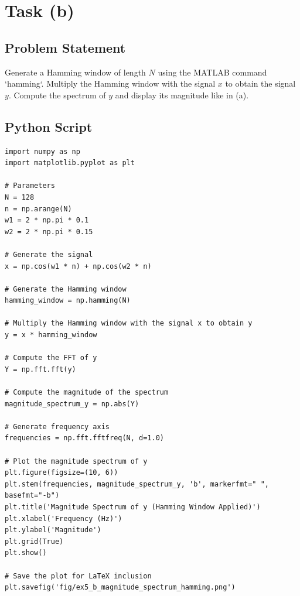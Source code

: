 \item[(b)]
\section*{Task (b)}

\subsection*{Problem Statement}
Generate a Hamming window of length \( N \) using the MATLAB command `hamming`. Multiply the Hamming window with the signal \( x \) to obtain the signal \( y \). Compute the spectrum of \( y \) and display its magnitude like in (a).

\subsection*{Python Script}
\begin{verbatim}
import numpy as np
import matplotlib.pyplot as plt

# Parameters
N = 128
n = np.arange(N)
w1 = 2 * np.pi * 0.1
w2 = 2 * np.pi * 0.15

# Generate the signal
x = np.cos(w1 * n) + np.cos(w2 * n)

# Generate the Hamming window
hamming_window = np.hamming(N)

# Multiply the Hamming window with the signal x to obtain y
y = x * hamming_window

# Compute the FFT of y
Y = np.fft.fft(y)

# Compute the magnitude of the spectrum
magnitude_spectrum_y = np.abs(Y)

# Generate frequency axis
frequencies = np.fft.fftfreq(N, d=1.0)

# Plot the magnitude spectrum of y
plt.figure(figsize=(10, 6))
plt.stem(frequencies, magnitude_spectrum_y, 'b', markerfmt=" ", basefmt="-b")
plt.title('Magnitude Spectrum of y (Hamming Window Applied)')
plt.xlabel('Frequency (Hz)')
plt.ylabel('Magnitude')
plt.grid(True)
plt.show()

# Save the plot for LaTeX inclusion
plt.savefig('fig/ex5_b_magnitude_spectrum_hamming.png')
\end{verbatim}

